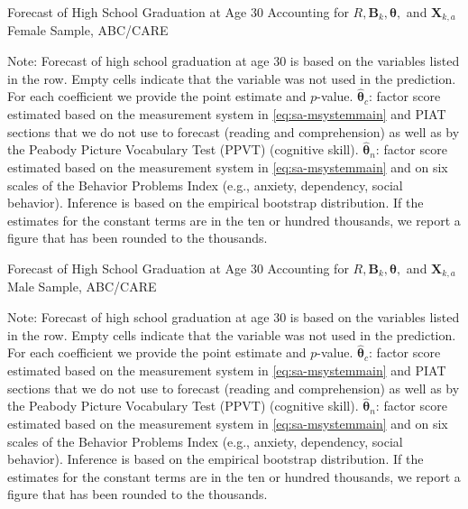\begin{table}
\begin{threeparttable}
\caption{Forecast of High School Graduation at Age 30 Accounting for $R, \bm{B}_k, \bm{\theta},$ and $\bm{X}_{k,a}$ Female Sample, ABC/CARE}
\label{table:end2}
\centering
\scriptsize

\begin{tablenotes}
\footnotesize
\item Note: Forecast of high school graduation at age 30 is based on the variables listed in the row. Empty cells indicate that the variable was not used in the prediction. For each coefficient we provide the point estimate and $p$-value. $\hat{\bm{\theta}}_{c}$: factor score estimated based on the measurement system in \eqref{eq:sa-msystemmain} and PIAT sections that we do not use to forecast (reading and comprehension) as well as by the Peabody Picture Vocabulary Test (PPVT) (cognitive skill). $\hat{\bm{\theta}}_{n}$: factor score estimated based on the measurement system in \eqref{eq:sa-msystemmain} and on six scales of the Behavior Problems Index (e.g., anxiety, dependency, social behavior). Inference is based on the empirical bootstrap distribution. If the estimates for the constant terms are in the ten or hundred thousands, we report a figure that has been rounded to the thousands.
\end{tablenotes}
\end{threeparttable}
\end{table}

\begin{table}
\begin{threeparttable}
\caption{Forecast of High School Graduation at Age 30 Accounting for $R, \bm{B}_k, \bm{\theta},$ and $\bm{X}_{k,a}$ Male Sample, ABC/CARE}
\label{table:end2}
\centering
\scriptsize

\begin{tablenotes}
\footnotesize
\item Note: Forecast of high school graduation at age 30 is based on the variables listed in the row. Empty cells indicate that the variable was not used in the prediction. For each coefficient we provide the point estimate and $p$-value. $\hat{\bm{\theta}}_{c}$: factor score estimated based on the measurement system in \eqref{eq:sa-msystemmain} and PIAT sections that we do not use to forecast (reading and comprehension) as well as by the Peabody Picture Vocabulary Test (PPVT) (cognitive skill). $\hat{\bm{\theta}}_{n}$: factor score estimated based on the measurement system in \eqref{eq:sa-msystemmain} and on six scales of the Behavior Problems Index (e.g., anxiety, dependency, social behavior). Inference is based on the empirical bootstrap distribution. If the estimates for the constant terms are in the ten or hundred thousands, we report a figure that has been rounded to the thousands.
\end{tablenotes}
\end{threeparttable}
\end{table}


